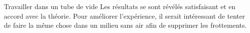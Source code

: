 Travailler dans un tube de vide
Les résultats se sont révélés satisfaisant et en accord avec la théorie.
Pour améliorer l'expérience, il serait intéressant de tenter de faire la même chose dans un milieu sans air afin de supprimer les frottements.